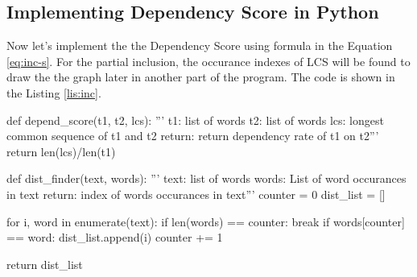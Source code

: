 \subsection{Implementing Dependency Score in Python}
Now let's implement the the Dependency Score using formula in the
Equation \ref{eq:inc-s}. For the partial inclusion, the occurance
indexes of LCS will be found to draw the the graph later in another
part of the program. The code is shown in the Listing \ref{lis:inc}.
\begin{python}[caption=Inclusion Score, label=lis:inc]
def depend_score(t1, t2, lcs):
    '''
    t1: list of words
    t2: list of words
    lcs: longest common sequence of t1 and t2
    return: return dependency rate of t1 on t2'''
    return  len(lcs)/len(t1)


def dist_finder(text, words):
    '''
    text: list of words
    words: List of word occurances in text
    return: index of words occurances in text'''
    counter = 0
    dist_list = []

    for i, word in enumerate(text):
        if len(words) == counter:
            break
        if words[counter] == word:
            dist_list.append(i)
            counter += 1

    return dist_list
\end{python}